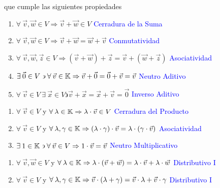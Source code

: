 \begin{definition}
    que cumple las siguientes propiedades
    \begin{enumerate}[label=(\subscript{\oplus}{{\arabic*}})]
    \item $\forall \: \vec{v}, \vec{w} \in V \Rightarrow \vec{v} + \vec{w}\in V$ \hfill \textcolor{blue}{Cerradura de la Suma}
    \item $\forall \: \vec{v}, \vec{w} \in V \Rightarrow \vec{v} + \vec{w} = \vec{w} + \vec{v}$ \hfill \textcolor{blue}{Conmutatividad}
    \item $\forall \: \vec{v}, \vec{w}, \vec{z} \in V \Rightarrow (\vec{v} + \vec{w}) + \vec{z} =\vec{v} + (\vec{w} + \vec{z})$ \hfill \textcolor{blue}{Asociatividad}
    \item  $\exists  \: \vec{0} \in V  \backepsilon \forall \: \vec{v} \in \mathbb{K} \Rightarrow \vec{v}+\vec{0} = \vec{0}+\vec{v} = \vec{v}$ \hfill \textcolor{blue}{Neutro Aditivo}
    \item $\forall \: \vec{v}  \in V \: \exists \: \vec{x} \in V \backepsilon \vec{v}+\vec{x}  = \vec{x}+\vec{v} = \vec{0}$ \hfill \textcolor{blue}{Inverso Aditivo}
    \end{enumerate}
    \begin{enumerate}[label=(\subscript{\odot}{{\arabic*}})]
    \item $\forall \: \vec{v} \in V$ y $\forall \: \lambda \in \mathbb{K} \Rightarrow \lambda \cdot \vec{v} \in V$ \hfill \textcolor{blue}{Cerradura del Producto}
    \item $\forall \: \vec{v} \in V$ y $\forall \: \lambda, \gamma \in \mathbb{K} \Rightarrow (\lambda \cdot \gamma) \cdot \vec{v} = \lambda \cdot (\gamma \cdot \vec{v})$ \hfill \textcolor{blue}{Asociatividad}
    \item $\exists \: 1 \in \mathbb{K} \backepsilon \forall \: \vec{v} \in V \Rightarrow 1 \cdot \vec{v} = \vec{v}$ \hfill \textcolor{blue}{Neutro Multiplicativo}
    \end{enumerate}
    \begin{enumerate}[label=(\subscript{D}{{\arabic*}})]
    \item $\forall \: \vec{v}, \vec{w} \in V$ y $\forall \: \lambda \in \mathbb{K} \Rightarrow \lambda \cdot  (\vec{v} + \vec{w}) = \lambda \cdot \vec{v} + \lambda \cdot \vec{w} $ \hfill \textcolor{blue}{Distributivo I}
    \item $\forall \: \vec{v}\in V$ y $\forall \: \lambda, \gamma \in \mathbb{K} \Rightarrow \vec{v} \cdot  (\lambda + \gamma) = \vec{v}  \cdot \lambda+ \vec{v}  \cdot \gamma $ \hfill \textcolor{blue}{Distributivo I}    \end{enumerate}
\end{definition}

